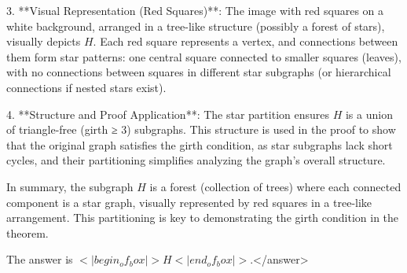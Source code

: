 3. **Visual Representation (Red Squares)**: The image with red squares on a white background, arranged in a tree-like structure (possibly a forest of stars), visually depicts \( H \). Each red square represents a vertex, and connections between them form star patterns: one central square connected to smaller squares (leaves), with no connections between squares in different star subgraphs (or hierarchical connections if nested stars exist).  

4. **Structure and Proof Application**: The star partition ensures \( H \) is a union of triangle-free (girth ≥ 3) subgraphs. This structure is used in the proof to show that the original graph satisfies the girth condition, as star subgraphs lack short cycles, and their partitioning simplifies analyzing the graph’s overall structure.  

In summary, the subgraph \( H \) is a forest (collection of trees) where each connected component is a star graph, visually represented by red squares in a tree-like arrangement. This partitioning is key to demonstrating the girth condition in the theorem.  

The answer is \(<|begin_of_box|>H<|end_of_box|>\).</answer>